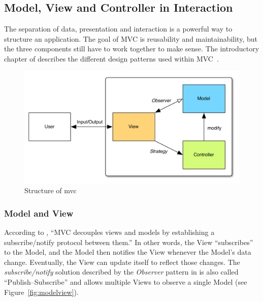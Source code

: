 \subsection{Model, View and Controller in Interaction}
The separation of data, presentation and interaction is a powerful way to structure an application. The goal of MVC is reusability and maintainability, but the three components still have to work together to make sense. The introductory chapter of  describes the different design patterns used within MVC~\cite[pp. 4--6]{gof}.

\begin{figure}[H]
	\centering
	\includegraphics[width=12cm]{images/mvc.pdf}
	\caption{Structure of \acl{mvc}}
	\label{fig:mvc}
\end{figure}



\subsubsection{Model and View}
\label{sec:modelview}
According to , ``MVC decouples views and models by establishing a subscribe/notify protocol between them.'' In other words, the View ``subscribes'' to the Model, and the Model then notifies the View whenever the Model's data change. Eventually, the View can update itself to reflect those changes. The \emph{subscribe/notify} solution described by the \emph{Observer} pattern in  is also called ``Publish--Subscribe'' and allows multiple Views to observe a single Model (see Figure~\ref{fig:modelview}).

